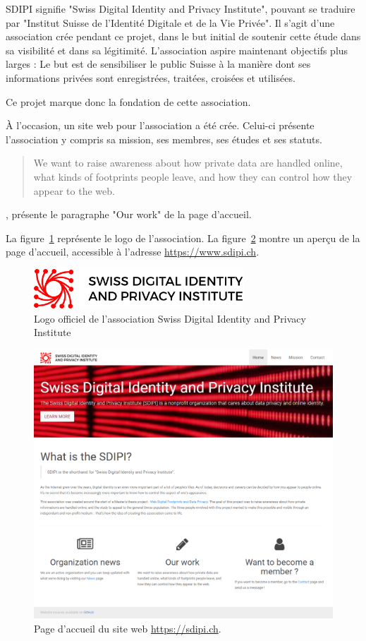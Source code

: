 SDIPI signifie "Swiss Digital Identity and Privacy Institute", pouvant se traduire par "Institut Suisse de l'Identité Digitale et de la Vie Privée". Il s'agit d'une association crée pendant ce projet, dans le but initial de soutenir cette étude dans sa visibilité et dans sa légitimité. L'association aspire maintenant objectifs plus larges : Le but est de sensibiliser le public Suisse à la manière dont ses informations privées sont enregistrées, traitées, croisées et utilisées.

Ce projet marque donc la fondation de cette association. 

À l'occasion, un site web pour l'association a été crée. Celui-ci présente l'association y compris sa mission, ses membres, ses études et ses statuts.

\blockquote{We want to raise awareness about how private data are handled online, what kinds of footprints people leave, and how they can control how they appear to the web.}, présente le paragraphe "Our work" de la page d'accueil.

La figure~\ref{a-sdipi-logo} représente le logo de l'association. La figure~\ref{a-sdipi} montre un aperçu de la page d'accueil, accessible à l'adresse \url{https://www.sdipi.ch}.

\begin{figure}[h]
	\centering
	\includegraphics[width=0.7\textwidth]{images/annexes/logo_sdipi}
	\caption{Logo officiel de l'association Swiss Digital Identity and Privacy Institute}
	\label{a-sdipi-logo}
\end{figure}

\begin{figure}[h]
	\centering
	\includegraphics[width=1\textwidth]{images/design/sdipi_home}
	\caption{Page d'accueil du site web \url{https://sdipi.ch}.}
	\label{a-sdipi}
\end{figure}